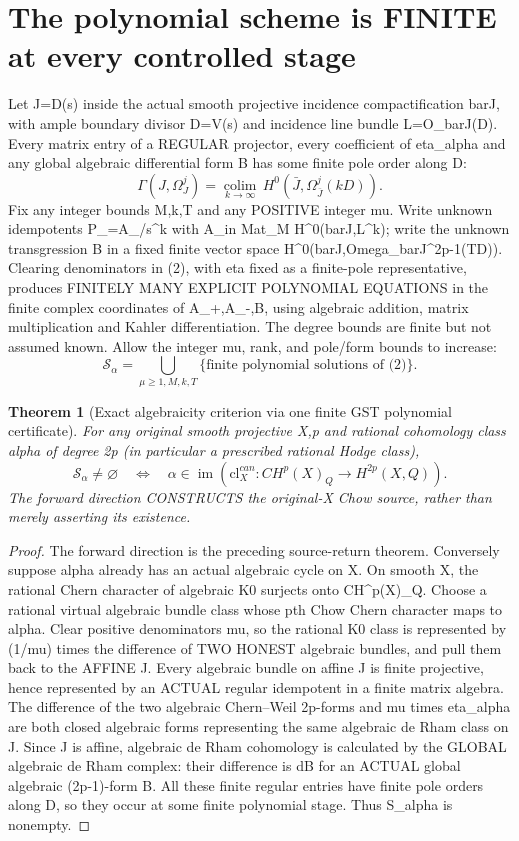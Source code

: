 \documentclass[11pt]{article}
\newtheorem{theorem}{Theorem}[section]
\begin{document}
\section{The polynomial scheme is FINITE at every controlled stage}
Let J=D(s) inside the actual smooth projective
incidence compactification barJ, with ample boundary divisor
D=V(s) and incidence line bundle L=O_barJ(D).
Every matrix entry of a REGULAR projector, every coefficient
of eta_alpha and any global algebraic differential form B
has some finite pole order along D:
\[
 \Gamma(J,\Omega_J^j)
 =\underset{k\to\infty}{\operatorname{colim}}\,
 H^0(\bar J,\Omega_{\bar J}^j(kD)).
 \tag{4}
\]
Fix any integer bounds M,k,T and any POSITIVE integer mu. Write unknown idempotents
P_\pm=A_\pm/s^k with
A_\pm in Mat_M H^0(barJ,L^k);
write the unknown transgression B in a fixed finite
vector space H^0(barJ,Omega_barJ^{2p-1}(TD)).
Clearing denominators in (2), with eta fixed as
a finite-pole representative, produces FINITELY MANY
EXPLICIT POLYNOMIAL EQUATIONS in the finite complex
coordinates of A_+,A_-,B, using algebraic addition,
matrix multiplication and Kahler differentiation.
The degree bounds are finite but not assumed known.
Allow the integer mu, rank, and pole/form bounds to increase:
\[
 \boxed{\mathscr S_\alpha=\bigcup_{\mu\ge1,M,k,T}
          \{\text{finite polynomial solutions of (2)}\}.}
 \tag{5}
\]

\begin{theorem}[Exact algebraicity criterion via one finite GST polynomial certificate]
For any original smooth projective X,p and rational
cohomology class alpha of degree 2p (in particular
a prescribed rational Hodge class),
\[
 \boxed{
 \mathscr S_\alpha\ne\varnothing
 \quad\Longleftrightarrow\quad
 \alpha\in\operatorname{im}
   (\mathrm{cl}^{can}_X:CH^p(X)_Q\to H^{2p}(X,Q)).
 }                                                     \tag{6}
\]
The forward direction CONSTRUCTS the original-X Chow source,
rather than merely asserting its existence.
\end{theorem}
\begin{proof}
The forward direction is the preceding source-return theorem.
Conversely suppose alpha already has an actual algebraic cycle
on X. On smooth X, the rational Chern character of algebraic K0
surjects onto CH^p(X)_Q. Choose a rational virtual
algebraic bundle class whose pth Chow Chern character maps to alpha.
Clear positive denominators mu, so the rational K0 class
is represented by (1/mu) times the difference of TWO
HONEST algebraic bundles,
and pull them back to the AFFINE J. Every algebraic bundle
on affine J is finite projective, hence represented by an
ACTUAL regular idempotent in a finite matrix algebra.
The difference of the two algebraic Chern--Weil 2p-forms
and mu times eta_alpha are both closed algebraic forms representing
the same algebraic de Rham class on J.
Since J is affine, algebraic de Rham cohomology is calculated
by the GLOBAL algebraic de Rham complex:
their difference is dB for an ACTUAL global algebraic
(2p-1)-form B. All these finite regular entries have finite
pole orders along D, so they occur at some finite polynomial
stage. Thus S_alpha is nonempty.
\end{proof}
\end{document}
